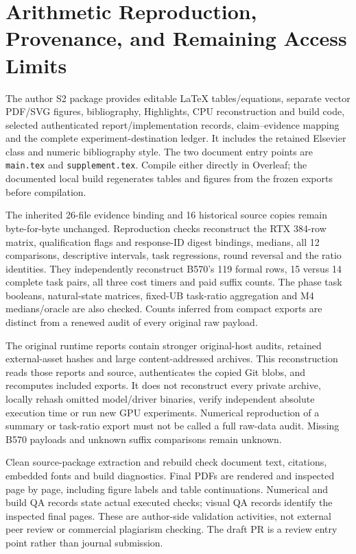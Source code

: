 \section{Arithmetic Reproduction, Provenance, and Remaining Access Limits}
\label{supp:reproducibility}
The author S2 package provides editable LaTeX tables/equations, separate vector PDF/SVG figures, bibliography, Highlights, CPU reconstruction and build code, selected authenticated report/implementation records, claim--evidence mapping and the complete experiment-destination ledger. It includes the retained Elsevier class and numeric bibliography style. The two document entry points are \texttt{main.tex} and \texttt{supplement.tex}. Compile either directly in Overleaf; the documented local build regenerates tables and figures from the frozen exports before compilation.

The inherited 26-file evidence binding and 16 historical source copies remain byte-for-byte unchanged. Reproduction checks reconstruct the RTX 384-row matrix, qualification flags and response-ID digest bindings, medians, all 12 comparisons, descriptive intervals, task regressions, round reversal and the ratio identities. They independently reconstruct B570's 119 formal rows, 15 versus 14 complete task pairs, all three cost timers and paid suffix counts. The phase task booleans, natural-state matrices, fixed-UB task-ratio aggregation and M4 medians/oracle are also checked. Counts inferred from compact exports are distinct from a renewed audit of every original raw payload.

The original runtime reports contain stronger original-host audits, retained external-asset hashes and large content-addressed archives. This reconstruction reads those reports and source, authenticates the copied Git blobs, and recomputes included exports. It does not reconstruct every private archive, locally rehash omitted model/driver binaries, verify independent absolute execution time or run new GPU experiments. Numerical reproduction of a summary or task-ratio export must not be called a full raw-data audit. Missing B570 payloads and unknown suffix comparisons remain unknown.

Clean source-package extraction and rebuild check document text, citations, embedded fonts and build diagnostics. Final PDFs are rendered and inspected page by page, including figure labels and table continuations. Numerical and build QA records state actual executed checks; visual QA records identify the inspected final pages. These are author-side validation activities, not external peer review or commercial plagiarism checking. The draft PR is a review entry point rather than journal submission.

